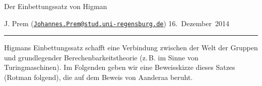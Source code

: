 %

\vspace*{-0.5cm}
\begin{center}
    \Large Der Einbettungssatz von Higman
\end{center}

\medskip\noindent
J. Prem (\href{mailto:Johannes.Prem@stud.uni-regensburg.de}%
{\texttt{Johannes.Prem@stud.uni-regensburg.de}})
\hfill
16.~Dezember~2014
\\[-8pt]
\rule{\textwidth}{0.4pt}

\begin{center}
    \parbox{0.82\textwidth}{%
        Higmans Einbettungssatz schafft eine Verbindung zwischen der Welt der
        Gruppen und grundlegender Berechenbarkeitstheorie (z.\,B. im Sinne von
        Turingmaschinen). Im Folgenden geben wir eine Beweisskizze dieses
        Satzes (Rotman\cite{bookc:rotman95} folgend), die auf dem Beweis
        von Aanderaa\cite{paper:aanderaa73} beruht.
    }
\end{center}
